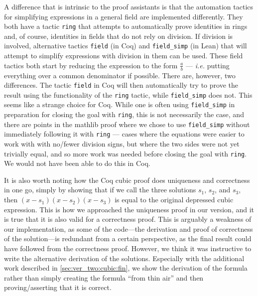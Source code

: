 \documentclass{article} %
\theoremstyle{plain}
\theoremstyle{definition}
\newcommand{\Lean}{\textsf{Lean}\xspace}
\newcommand{\mathlib}{\textsf{mathlib}\xspace}
\begin{document}
A difference that is intrinsic to the proof assistants is that the automation tactics for simplifying expressions in a general field are implemented differently.
They both have a tactic \lstinline!ring! that attempts to automatically prove identities in rings and, of course, identities in fields that do not rely on division.
If division is involved, alternative tactics \lstinline!field! (in Coq) 
and \lstinline!field_simp! (in \Lean) 
\cite{lean_field}
that will attempt to simplify expressions with division in them can be used.
These field tactics both start by reducing the expression to the form $\frac{a}{b}$ ---
\textit{i.e.} putting everything over a common denominator if possible.
There are, however, two differences.
The tactic \lstinline!field! in Coq will then automatically try to prove the result using the functionality of the \lstinline{ring} tactic, while \lstinline{field_simp} does not.
This seems like a strange choice for Coq.
While one is often using \lstinline{field_simp} in preparation for closing the goal with \lstinline{ring}, this is not necessarily the case,
and there are points in the \mathlib proof where we chose to use \lstinline{field_simp} without immediately following it with \lstinline{ring} ---
cases where the equations were easier to work with with no/fewer division signs, but where the two sides were not yet trivially equal,
and so more work was needed before closing the goal with \lstinline{ring}.
We would not have been able to do this in Coq.

It is also worth noting how the Coq cubic proof does uniqueness and correctness in one go, simply by showing that
if we call the three solutions $s_1$, $s_2$, and $s_3$,
then $(x - s_1)(x - s_2)(x - s_3)$ is equal to the original depressed cubic expression.
This is how we approached the uniqueness proof in our version, and it is true that it is also valid for a correctness proof.
This is arguably a weakness of our implementation, as some of the code---the derivation and proof of correctness of the solution---is redundant from a certain perspective, as the final result could have followed from the correctness proof.
However, we think it was instructive to write the alternative derivation of the solutions.
Especially with the additional work described in \cref{sec:ver_two:cubic:fin},
we show the derivation of the formula rather than simply creating the formula ``from thin air'' and then proving/asserting that it is correct.
\end{document}
